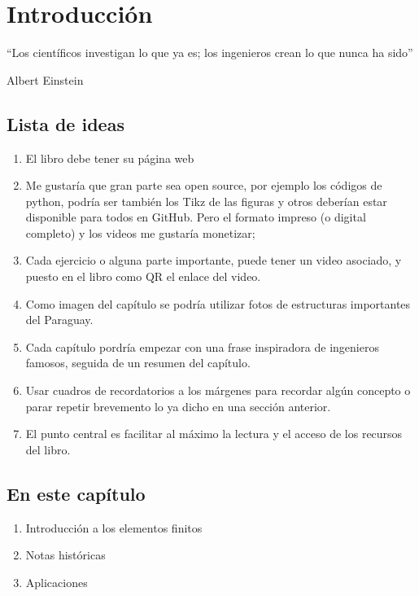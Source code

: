 
\setchapterpreamble[u]{\margintoc}


\chapter{Introducción} \label{chap:intro}

\begin{kaobox}
	``Los científicos investigan lo que ya es; los ingenieros crean lo que nunca ha sido”
\begin{flushright}
	Albert Einstein
\end{flushright}
\end{kaobox}


\section{Lista de ideas}

\begin{enumerate}
	\item El libro debe tener su página web
	\item Me gustaría que gran parte sea open source, por ejemplo los códigos de python, podría ser también los Tikz de las figuras y otros deberían estar disponible para todos en GitHub. Pero el formato impreso (o digital completo) y los videos me gustaría monetizar;
	\item Cada ejercicio o alguna parte importante, puede tener un video asociado, y puesto en el libro como QR el enlace del video.
	\item Como imagen del capítulo se podría utilizar fotos de estructuras importantes del Paraguay.
	\item Cada capítulo pordría empezar con una frase inspiradora de ingenieros famosos, seguida de un resumen del capítulo.
	\item Usar cuadros de recordatorios a los márgenes para recordar algún concepto o parar repetir brevemento lo ya dicho en una sección anterior.
	\item El punto central es facilitar al máximo la lectura y el acceso de los recursos del libro.
\end{enumerate}


\section{En este capítulo}

\begin{enumerate}
	\item Introducción a los elementos finitos
	\item Notas históricas
	\item Aplicaciones
\end{enumerate}

